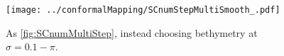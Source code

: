 \documentclass[internal]{sintefmemo}
\renewcommand{\_}[1]{_\mr{#1}}
\newcommand{\yy}{\sigma}
\begin{document}
\begin{figure}[h!ptb]%
\centering
\texttt{[image: ../conformalMapping/SCnumStepMultiSmooth\_z.pdf]}%
\caption{As \autoref{fig:SCnumMultiStep}, instead choosing bethymetry at $\yy = 0.1-\pi$.
}%
\label{fig:SCnumMultiStepSmooth}%
\end{figure}

\end{document}
